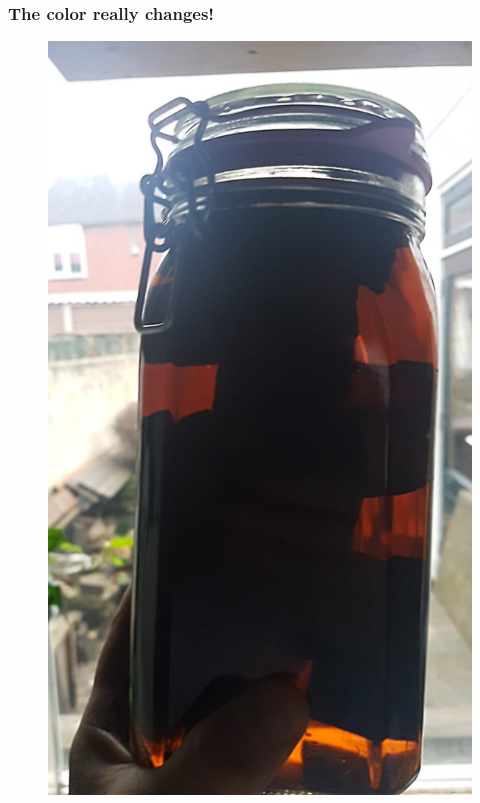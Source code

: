 \documentclass{beamer}
\begin{document}
\begin{frame}
\frametitle{The color really changes!}
\begin{figure}
\includegraphics[height=.7\textheight]{images/aging-sanitzer.jpeg}
\end{figure}
\end{frame}
\end{document}
